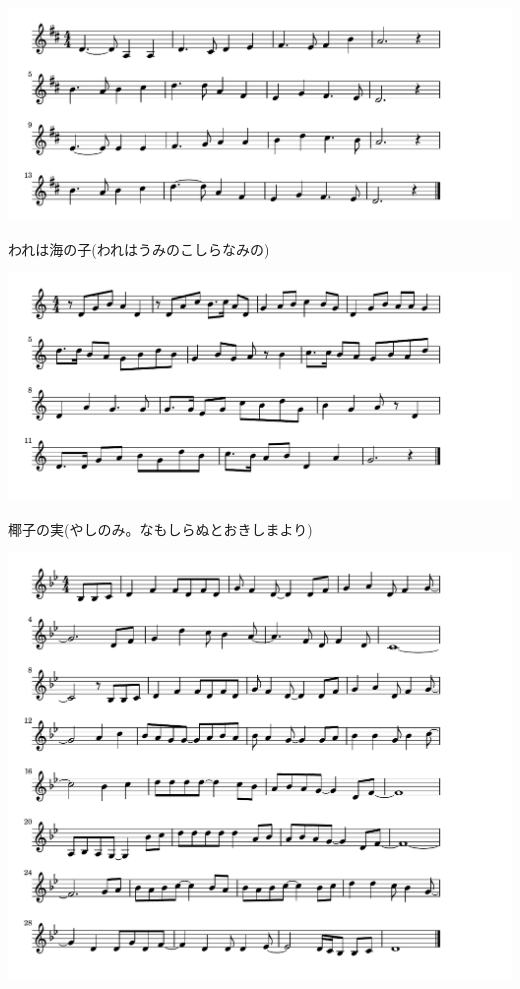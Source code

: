 \documentclass[a4paper]{ltjsarticle}
\begin{document}
\includegraphics[clip]{warewaumi_crop.pdf}

\vspace{-10mm} \hspace{10mm}
われは海の子(われはうみのこしらなみの)

\includegraphics[clip]{yashinomi_crop.pdf}

\vspace{-10mm} \hspace{10mm}
椰子の実(やしのみ。なもしらぬとおきしまより)

\includegraphics[clip]{yesterdayonce_crop.pdf}
\end{document}
